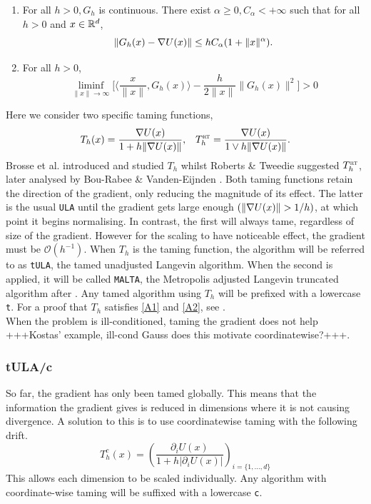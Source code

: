 \begin{enumerate}[label={\bf A{\arabic*}}]
	\item  For all \(h>0, G_h\) is continuous. There exist \(\alpha\geq 0, C_{\alpha}<+\infty\) such that for all \(h >0 \) and \(x \in \mathbb{R}^d\),
		\[\|G_h(x)-\nabla U(x)\| \leq hC_{\alpha}(1+\|x\|^{\alpha}).\]\label{A1}
	\item For all \(h>0\),
		\[ \liminf_{\|x\|\to \infty} \bigg\lbrack \bigg\langle \frac{x}{\|x\|}, G_h(x)\bigg\rangle - \frac{h}{2\|x\|}\|G_h(x)\|^2\bigg\rbrack >0\]\label{A2}
\end{enumerate}
Here we consider two specific taming functions,
 \begin{align*}
 T_h(x) = \frac{\nabla U(x)}{1+h\|\nabla U(x)\|}, &&  T^{\text{\sc \tiny RT}}_h = \frac{\nabla U(x)}{1\vee h\|\nabla U(x)\|}.
 \end{align*}
Brosse et al. introduced and studied \(T_h\) whilst Roberts \& Tweedie suggested \(T^{\text{\sc \tiny RT}}_h\), later analysed by Bou-Rabee \& Vanden-Eijnden \cite{BV10MALTA,Brosse18tULA,RT96}. Both taming functions retain the direction of the gradient, only reducing the magnitude of its effect. The latter is the usual \texttt{ULA} until the gradient gets large enough \((\|\grad U(x)\|> 1/h)\), at which point it begins normalising. In contrast, the first will always tame, regardless of size of the gradient. However for the scaling to have noticeable effect, the gradient must be \(\mathcal{O}(h^{-1})\).
When \(T_h\) is the taming function, the algorithm will be referred to as \texttt{tULA}, the tamed unadjusted Langevin algorithm. When the second is applied, it will be called \texttt{MALTA}, the Metropolis adjusted Langevin truncated algorithm after \cite{RT96}. Any tamed algorithm using \(T_h\) will be prefixed with a lowercase \texttt{t}. For a proof that \(T_h\) satisfies \ref{A1} and \ref{A2}, see \cite[Lemma~2]{Brosse18tULA}.
\\
When the problem is ill-conditioned, taming the gradient does not help +++Kostas' example, ill-cond Gauss does this motivate coordinatewise?+++. 
\subsubsection{tULA/c}
So far, the gradient has only been tamed globally. This means that the information the gradient gives is reduced in dimensions where it is not causing divergence. A solution to this is to use coordinatewise taming with the following drift.
  \[T^c_{h}(x) =\left(\frac{\partial_i U(x)}{1+h|\partial_i U(x)|}\right)_{i=\lbrace 1, \dots, d\rbrace} \]
This allows each dimension to be scaled individually. Any algorithm with coordinate-wise taming will be suffixed with a lowercase \texttt{c}.

